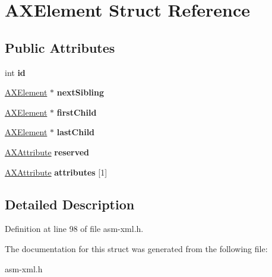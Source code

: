 \hypertarget{structAXElement}{\section{A\-X\-Element Struct Reference}
\label{structAXElement}
}
\subsection*{Public Attributes}
\begin{DoxyCompactItemize}
\item 
\hypertarget{structAXElement_af452759b850b9b28cda22a6de9eb48c9}{int {\bfseries id}}\label{structAXElement_af452759b850b9b28cda22a6de9eb48c9}

\item 
\hypertarget{structAXElement_aeea5b9a2de7df84a9a9e7d3976c729e5}{\hyperlink{structAXElement}{A\-X\-Element} $\ast$ {\bfseries next\-Sibling}}\label{structAXElement_aeea5b9a2de7df84a9a9e7d3976c729e5}

\item 
\hypertarget{structAXElement_aae2e7af0454c12f283122502eff662f7}{\hyperlink{structAXElement}{A\-X\-Element} $\ast$ {\bfseries first\-Child}}\label{structAXElement_aae2e7af0454c12f283122502eff662f7}

\item 
\hypertarget{structAXElement_ad5eeef7ab07738ef67a2e847ac2d3ab9}{\hyperlink{structAXElement}{A\-X\-Element} $\ast$ {\bfseries last\-Child}}\label{structAXElement_ad5eeef7ab07738ef67a2e847ac2d3ab9}

\item 
\hypertarget{structAXElement_a1ff64be96ffc7ae4f479cbd1fa335f12}{\hyperlink{structAXAttribute}{A\-X\-Attribute} {\bfseries reserved}}\label{structAXElement_a1ff64be96ffc7ae4f479cbd1fa335f12}

\item 
\hypertarget{structAXElement_a4217bcc12ae4279dda1d3744d64e1abd}{\hyperlink{structAXAttribute}{A\-X\-Attribute} {\bfseries attributes} \mbox{[}1\mbox{]}}\label{structAXElement_a4217bcc12ae4279dda1d3744d64e1abd}

\end{DoxyCompactItemize}


\subsection{Detailed Description}


Definition at line 98 of file asm-\/xml.\-h.



The documentation for this struct was generated from the following file\-:\begin{DoxyCompactItemize}
\item 
asm-\/xml.\-h\end{DoxyCompactItemize}
